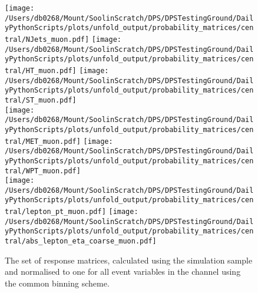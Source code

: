 \begin{figure}[hp]
	\centering
	\texttt{[image: /Users/db0268/Mount/SoolinScratch/DPS/DPSTestingGround/DailyPythonScripts/plots/unfold\_output/probability\_matrices/central/NJets\_muon.pdf]} 
	\texttt{[image: /Users/db0268/Mount/SoolinScratch/DPS/DPSTestingGround/DailyPythonScripts/plots/unfold\_output/probability\_matrices/central/HT\_muon.pdf]}
	\texttt{[image: /Users/db0268/Mount/SoolinScratch/DPS/DPSTestingGround/DailyPythonScripts/plots/unfold\_output/probability\_matrices/central/ST\_muon.pdf]} \\
	\texttt{[image: /Users/db0268/Mount/SoolinScratch/DPS/DPSTestingGround/DailyPythonScripts/plots/unfold\_output/probability\_matrices/central/MET\_muon.pdf]}
	\texttt{[image: /Users/db0268/Mount/SoolinScratch/DPS/DPSTestingGround/DailyPythonScripts/plots/unfold\_output/probability\_matrices/central/WPT\_muon.pdf]} \\
	\texttt{[image: /Users/db0268/Mount/SoolinScratch/DPS/DPSTestingGround/DailyPythonScripts/plots/unfold\_output/probability\_matrices/central/lepton\_pt\_muon.pdf]} 
	\texttt{[image: /Users/db0268/Mount/SoolinScratch/DPS/DPSTestingGround/DailyPythonScripts/plots/unfold\_output/probability\_matrices/central/abs\_lepton\_eta\_coarse\_muon.pdf]} \\
	\caption[The set of response matrices, calculated using the \powhegpythia{} simulation sample and normalised to one for all event variables in the \muJets{} channel using the common binning scheme.]{The set of response matrices, calculated using the \powhegpythia{} simulation sample and normalised to one for all event variables in the \muJets{} channel using the common binning scheme.}
	\label{fig:ResponseMatricesMU}
\end{figure}
